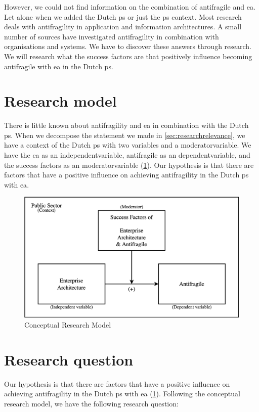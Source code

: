 However, we could not find information on the combination of \gls{antifragile} and \gls{ea}. Let alone when we added the Dutch \gls{ps} or just the \gls{ps} context. Most research deals with \gls{antifragility} in application and information architectures. A small number of sources have investigated \gls{antifragility} in combination with organisations and systems. We have to discover these answers through research. We will research what the success factors are that positively influence becoming \gls{antifragile} with \gls{ea} in the Dutch \gls{ps}.

\section{Research model}
\label{sec:conceptualmodel}
There is little known about \gls{antifragility} and \gls{ea} in combination with the Dutch \gls{ps}.  When we decompose the statement we made in \cref{sec:researchrelevance}, we have a context of the Dutch \gls{ps} with two variables and a \gls{moderatorvariable}. We have the \gls{ea} as an \gls{independentvariable}, \gls{antifragile} as an \gls{dependentvariable}, and the success factors as an \gls{moderatorvariable} (\cref{fig:conceptualmodel}). Our hypothesis is that there are factors that have a positive influence on achieving \gls{antifragility} in the Dutch \gls{ps} with \gls{ea}.
\begin{figure}[H]
	\centering
	\includegraphics[width=0.7\linewidth]{images/conceptualmodel}
	\caption[Conceptual Research Model]{Conceptual Research Model}
	\label{fig:conceptualmodel}
\end{figure}

\section{Research question}
\label{sec:introresearchquestion}
Our hypothesis is that there are factors that have a positive influence on achieving \gls{antifragility} in the Dutch \gls{ps} with \gls{ea} (\cref{fig:conceptualmodel}). Following the conceptual research model, we have the following research question:

